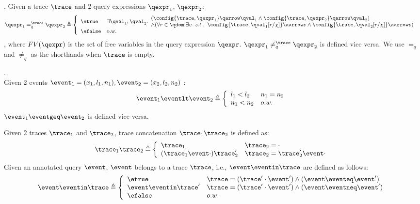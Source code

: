 \begin{defn}.
%
\label{def:query_equal}
Given a trace $\trace$ and 2 query expressions $\qexpr_1$, $\qexpr_2$:
$$
\qexpr_1 =_{q}^{\trace} \qexpr_2 \triangleq
\left\{
    \begin{array}{ll} 
      \etrue      
      & 
    \exists \qval_1, \qval_2.
    \begin{array}{l} 
      (\config{\trace,  \qexpr_1} \qarrow \qval_1 \land \config{\trace,  \qexpr_2 } \qarrow \qval_2) 
      \\
      \land (\forall r \in \qdom. \exists v. ~ s.t., ~ 
            \config{\trace, \qval_1[r/\chi]} \aarrow v \land \config{\trace,  \qval_2[r/\chi] } \aarrow v)  
    \end{array}\\
      \efalse         
      & \text{o.w.} 
    \end{array}
    \right.
$$
%
, where $FV(\qexpr)$ is the set of free variables in the query expression $\qexpr$.
$\qexpr_1 \neq_{q}^{\trace} \qexpr_2$  is defined vice versa.
%
We use $=_{q}$  and $\neq_{q}$ as the shorthands when $\trace$ is empty.
\end{defn}
%
\begin{defn}.
\label{def:query_dir}
\\
Given 2 events 
$\event_1 = (x_1, l_1, n_1), 
\event_2 = (x_2, l_2, n_2)$
:
%
\[
\event_1 \eventlt \event_2
 \triangleq 
 \left\{
 \begin{array}{ll}
    l_1 < l_2 & n_1 = n_2
    \\
    n_1 < n_2  & o.w.
\end{array}  
\right.
\]
%
$\event_1 \eventgeq \event_2$  is defined vice versa.
\end{defn}
%
%
Given 2 traces $\trace_1$ and $\trace_2$, trace concatenation $\trace_1 \trace_2$ is defined as:
\begin{equation}
    \trace_1 \trace_2 
    \triangleq \left\{
    \begin{array}{ll} 
      \trace_1                          & \trace_2 =  \cdot \\
      (\trace_1 \event \cdot) \trace_2' & \trace_2 =  \trace_2' \event \cdot \\ 
    \end{array}
    \right.
  \end{equation}
%
%
%
%
Given an annotated query $\event$, $\event$ belongs to a trace $\trace$, i.e., $\event \eventin \trace$ are defined as follows:
\begin{equation}
    \event \eventin \trace  
    \triangleq \left\{
    \begin{array}{ll} 
      \etrue                  & \trace =  (\trace' \cdot \event') \land (\event \eventeq \event') \\
      \event \eventin \trace' & \trace =  (\trace' \cdot \event') \land (\event \eventneq \event') \\ 
      \efalse                 & o.w.
    \end{array}
    \right.
  \end{equation}
